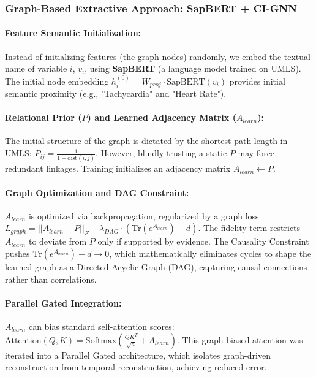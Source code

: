 \subsubsection{Graph-Based Extractive Approach: SapBERT + CI-GNN}
\paragraph{Feature Semantic Initialization:}
Instead of initializing features (the graph nodes) randomly, we embed the textual name of variable $i$, $v_i$, using \textbf{SapBERT} (a language model trained on UMLS). The initial node embedding $h_i^{(0)} = W_{proj} \cdot \text{SapBERT}(v_i)$ provides initial semantic proximity (e.g., "Tachycardia" and "Heart Rate").

\paragraph{Relational Prior ($P$) and Learned Adjacency Matrix ($A_{learn}$):}
The initial structure of the graph is dictated by the shortest path length in UMLS: $P_{ij} = \frac{1}{1 + \text{dist}(i, j)}$. However, blindly trusting a static $P$ may force redundant linkages. Training initializes an adjacency matrix $A_{learn} \leftarrow P$.

\paragraph{Graph Optimization and DAG Constraint:}
$A_{learn}$ is optimized via backpropagation, regularized by a graph loss $L_{graph} = ||A_{learn} - P||_F + \lambda_{DAG} \cdot (\text{Tr}(e^{A_{learn}}) - d)$. The fidelity term restricts $A_{learn}$ to deviate from $P$ only if supported by evidence. The Causality Constraint pushes $\text{Tr}(e^{A_{learn}}) - d \rightarrow 0$, which mathematically eliminates cycles to shape the learned graph as a Directed Acyclic Graph (DAG), capturing causal connections rather than correlations.

\paragraph{Parallel Gated Integration:}
$A_{learn}$ can bias standard self-attention scores: $\text{Attention}(Q, K) = \text{Softmax}\left(\frac{Q K^T}{\sqrt{d}} + A_{learn}\right)$. This graph-biased attention was iterated into a Parallel Gated architecture, which isolates graph-driven reconstruction from temporal reconstruction, achieving reduced error.

